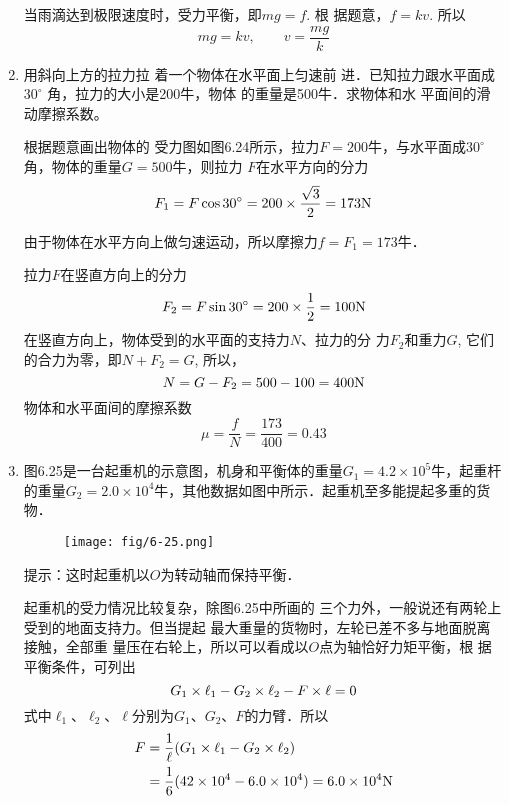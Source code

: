\begin{enumerate}
\begin{solution}
    当雨滴达到极限速度时，受力平衡，即$mg=f$. 根
    据题意，$f=kv$. 所以
    \[mg =kv,\qquad v=\frac{mg}{k}\]
\end{solution}
\item 用斜向上方的拉力拉
着一个物体在水平面上匀速前
进．已知拉力跟水平面成 $30^{\circ}$
角，拉力的大小是200牛，物体
的重量是500牛．求物体和水
平面间的滑动摩擦系数。

\begin{figure}[htp]
    \centering
{}
    \caption{}
\end{figure}

\begin{solution}
    根据题意画出物体的
    受力图如图6.24所示，拉力$F=200$牛，与水平面成$30^{\circ}$角，物体的重量$G=500$牛，则拉力
    $F$在水平方向的分力
\[    F_1=F\cos 30^{\circ}=200\times\frac{\sqrt{3}}{2}=173{\rm N}\]

由于物体在水平方向上做匀速运动，所以摩擦力$f=F_1=173$牛．

拉力$F$在竖直方向上的分力
\[F_2=F\sin 30^{\circ}=200\times\frac{1}{2}=100{\rm N}\]
在竖直方向上，物体受到的水平面的支持力$N$、拉力的分
力$F_2$和重力$G$, 它们的合力为零，即$N+F_2=G$, 所以，
\[N=G-F_2=500-100=400{\rm N}\]
物体和水平面间的摩擦系数
\[\mu=\frac{f}{N}=\frac{173}{400}=0.43\]
\end{solution}
\item 图6.25是一台起重机的示意图，机身和平衡体的重量$G_1=4.2\times 10^5$牛，起重杆的重量$G_2=2.0\times 10^4$牛，其他数据如图中所示．起重机至多能提起多重的货物．
\begin{figure}[htp]
\centering\texttt{[image: fig/6-25.png]}
\caption{}
\end{figure}
提示：这时起重机以$O$为转动轴而保持平衡．


\begin{solution}
    起重机的受力情况比较复杂，除图6.25中所画的
    三个力外，一般说还有两轮上受到的地面支持力。但当提起
    最大重量的货物时，左轮已差不多与地面脱离接触，全部重
    量压在右轮上，所以可以看成以$O$点为轴恰好力矩平衡，根
    据平衡条件，可列出
\[G_1\times\ell_1-G_2\times\ell_2-F\times\ell=0\]
式中$\ell_1$、$\ell_2$、$\ell$分别为$G_1$、$G_2$、$F$的力臂．所以
\[\begin{split}
    F&=\frac{1}{\ell}(G_1\times\ell_1-G_2\times\ell_2)\\
    &=\frac{1}{6}(42\times 10^4-6.0\times 10^4)=6.0\times 10^4{\rm N}
\end{split}\]
\end{solution}


\end{enumerate}
